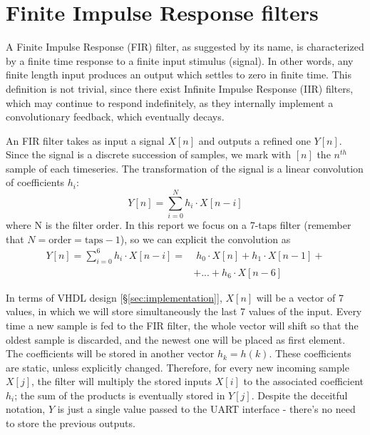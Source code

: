 \section{Finite Impulse Response filters}
\label{sec:firs}

A Finite Impulse Response (FIR) filter, as suggested by its name, is characterized by a finite time response to a finite input stimulus (signal). In other words, any finite length input produces an output which settles to zero in finite time. This definition is not trivial, since there exist Infinite Impulse Response (IIR) filters, which may continue to respond indefinitely, as they internally implement a convolutionary feedback, which eventually decays. \cite{wiki_fir}

An FIR filter takes as input a signal $X[n]$ and outputs a refined one $Y[n]$. Since the signal is a discrete succession of samples, we mark with $[n]$ the $n^{th}$ sample of each timeseries. The transformation of the signal is a linear convolution of coefficients $h_i$: 
\[Y[n]=\sum_{i=0}^{N}h_i \cdot X[n-i]\]
where N is the filter order. In this report we focus on a 7-taps filter (remember that $N = \textrm{order} = \textrm{taps} - 1$), so we can explicit the convolution as
\begin{equation}
\begin{split}  %
    Y[n] = \sum_{i=0}^{6}h_i \cdot X[n-i] = & \; h_0 \cdot X[n] + h_1 \cdot X[n-1] +\\
           & + ... + h_6 \cdot X[n-6] 
\end{split}
\label{eq:7fir}
\end{equation}

In terms of VHDL design [§\ref{sec:implementation}], $X[n]$ will be a vector of 7 values, in which we will store simultaneously the last 7 values of the input. Every time a new sample is fed to the FIR filter, the whole vector will shift so that the oldest sample is discarded, and the newest one will be placed as first element. The coefficients will be stored in another vector $h_k = h(k)$. These coefficients are static, unless explicitly changed. Therefore, for every new incoming sample $X[j]$, the filter will multiply the stored inputs $X[i]$ to the associated coefficient $h_i$; the sum of the products is eventually stored in $Y[j]$. Despite the deceitful notation, $Y$ is just a single value passed to the UART interface - there's no need to store the previous outputs.





